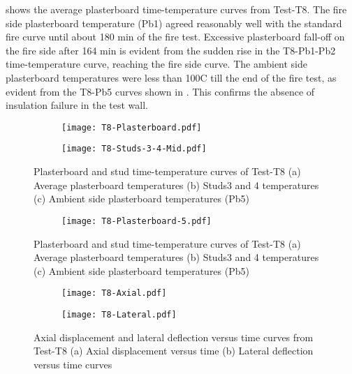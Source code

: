  shows the average plasterboard time-temperature curves from Test-T8. The fire side plasterboard temperature (Pb1) agreed reasonably well with the standard fire curve until about 180 min of the fire test. Excessive plasterboard fall-off on the fire side after 164 min is evident from the sudden rise in the T8-Pb1-Pb2 time-temperature curve, reaching the fire side curve. The ambient side plasterboard temperatures were less than 100\degree C till the end of the fire test, as evident from the T8-Pb5 curves shown in . This confirms the absence of insulation failure in the test wall.
\begin{figure}[!htbp]
	\centering
	\begin{subfigure}[b]{0.7\textwidth}
		\centering
		\texttt{[image: T8-Plasterboard.pdf]}
		\caption{}
		\label{subfig:T8-Plasterboard}
	\end{subfigure}
	\begin{subfigure}[b]{0.7\textwidth}
		\centering
		\texttt{[image: T8-Studs-3-4-Mid.pdf]}
		\caption{}
		\label{subfig:T8-Studs-3-4-Mid}
	\end{subfigure}
	\caption{Plasterboard and stud time-temperature curves of Test-T8 (a) Average plasterboard temperatures (b) Studs3 and 4 temperatures (c) Ambient side plasterboard temperatures (Pb5)}
	\label{fig:T8-time-temperature-a}
\end{figure}
\begin{figure}[!htbp]
	\ContinuedFloat
	\centering
	\begin{subfigure}[b]{0.7\textwidth}
		\centering
		\texttt{[image: T8-Plasterboard-5.pdf]}
		\caption{}
		\label{subfig:T8-Plasterboard-5}
	\end{subfigure}
	\caption{Plasterboard and stud time-temperature curves of Test-T8 (a) Average plasterboard temperatures (b) Studs3 and 4 temperatures (c) Ambient side plasterboard temperatures (Pb5)}
	\label{fig:T8-time-temperature-b}
\end{figure}
\begin{figure}[!htbp]
	\centering
	\begin{subfigure}[b]{0.7\textwidth}
		\centering
		\texttt{[image: T8-Axial.pdf]}
		\caption{}
		\label{subfig:T8-Axial}
	\end{subfigure}
	\begin{subfigure}[b]{0.7\textwidth}
		\centering
		\texttt{[image: T8-Lateral.pdf]}
		\caption{}
		\label{subfig:T8-Lateral}
	\end{subfigure}
	\caption{Axial displacement and lateral deflection versus time curves from Test-T8 (a) Axial displacement versus time (b) Lateral deflection versus time curves}
	\label{fig:T8-displacement}
\end{figure}

